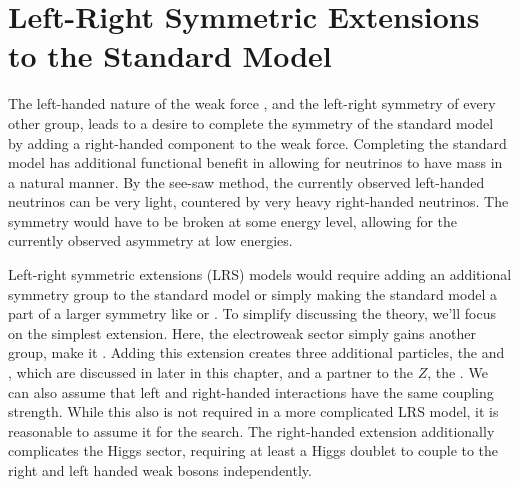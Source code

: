 \section{Left-Right Symmetric Extensions to the Standard Model}
\label{sec:LRStheory}
The left-handed nature of the weak force \SUtwoL, and the left-right symmetry of every other group, leads to a desire to complete the symmetry of the standard model by adding a right-handed component to the weak force.  Completing the standard model has additional functional benefit in allowing for neutrinos to have mass in a natural manner.  By the see-saw method, the currently observed left-handed neutrinos can be very light, countered by very heavy right-handed neutrinos. The symmetry would have to be broken at some energy level, allowing for the currently observed asymmetry at low energies.

Left-right symmetric extensions (LRS) models would require adding an additional symmetry group to the standard model or simply making the standard model a part of a larger symmetry like \SUfive or \Oten.  To simplify discussing the theory, we'll focus on the simplest extension.  Here, the electroweak sector simply gains another \SUtwo group, make it \SUlrs. Adding this extension creates three additional particles, the \WR and \NR, which are discussed in later in this chapter, and a partner to the \ensuremath{Z}, the \Zprime.  We can also assume that left and right-handed interactions have the same coupling strength.  While this also is not required in a more complicated LRS model, it is reasonable to assume it for the search. The right-handed extension additionally complicates the Higgs sector, requiring at least a Higgs doublet to couple to the right and left handed weak bosons independently.

